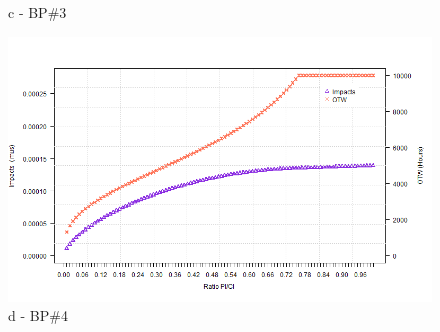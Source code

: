\begin{figure}[!htb]
\begin{minipage}[b]{0.5\linewidth}
		\caption*{c - BP\#3}
	\end{minipage}
	\hspace{0.05cm}
	\begin{minipage}[b]{0.5\linewidth}
		\centering
		\includegraphics[width=\textwidth]{figures/ch05_fig_sacipi_pump4}
		\caption*{d - BP\#4}
	\end{minipage}


\end{figure}
